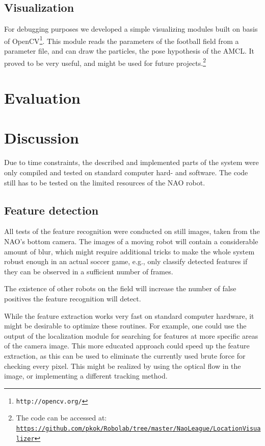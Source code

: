 \documentclass[	DIV=calc,%
							paper=a4,%
							fontsize=9pt,%
							twocolumn]{scrartcl}	 					%
\begin{document}
\subsection{Visualization}
For debugging purposes we developed a simple visualizing modules built on basis of OpenCV\footnote{\texttt{http://opencv.org/}}. This module reads the parameters of the football field from a parameter file, and can draw the particles, the pose hypothesis of the AMCL. It proved to be very useful, and might be used for future projects.\footnote{The code can be accessed at: \texttt{\url{https://github.com/pkok/Robolab/tree/master/NaoLeague/LocationVisualizer}}}

\section{Evaluation}
\label{sec:Evaluation}
\section{Discussion}
\label{sec:Discussion}
Due to time constraints, the described and implemented parts of the system were only compiled and tested on standard computer hard- and software. The code still has to be tested on the limited resources of the NAO robot.

\subsection{Feature detection}
All tests of the feature recognition were conducted on still images, taken from the NAO's bottom camera. The images of a moving robot will contain a considerable amount of blur, which might require additional tricks to make the whole system robust enough in an actual soccer game, e.g., only classify detected features if they can be observed in a sufficient number of frames.

The existence of other robots on the field will increase the number of false positives the feature recognition will detect.

While the feature extraction works very fast on standard computer hardware, it might be desirable to optimize these routines. For example, one could use the output of the localization module for searching for features at more specific areas of the camera image.  This more educated approach could speed up the feature extraction, as this can be used to eliminate the currently used brute force for checking every pixel.  This might be realized by using the optical flow in the image, or implementing a different tracking method.
\end{document}
